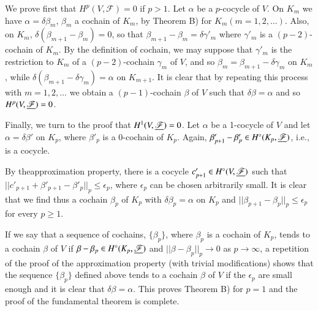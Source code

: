 \medskip
{} We prove first that $H^p(V,
\mathscr{F})=0$ if $p>1$.  Let $\alpha$ be a $p$-cocycle of $V$. On
$K_m$ we have $\alpha = \delta \beta_m$, $\beta_m$ a cochain of $K_m$,
by Theorem B) for $K_m (m = 1,2, \ldots)$. Also, on $K_m$, $\delta
(\beta_{m+1} - \beta_m) = 0$, so that $\beta_{m+1} - \beta_m = \delta
\gamma'_m$ where $\gamma'_m$ is a $(p-2)$-cochain of $K_m$. By the
definition of cochain, we may suppose that $\gamma'_m$ is the
restriction to $K_m$ of a $(p-2)$-cochain $\gamma_m$ of $V$, and so
$\beta_m = \beta_{m+1} - \delta \gamma_m$ on $K_{m}$, while $\delta
(\beta_{m+1} - \delta \gamma_m) = \alpha$ on $K_{m+1}$. It is clear
that by repeating this process with $m = 1,2, \ldots$ we obtain a
$(p-1)$-cochain $\beta$ of $V$ such that $\delta \beta = \alpha$ and
so $H^p (V, \underline{\mathscr{F}}) =0$. 

Finally, we turn to the proof that $H^1(V, \underline{\mathscr{F}}) = 0$. Let
$\alpha$ be a 1-cocycle of $V$ and let $\alpha = \delta \beta'$ on
$K_p$, where $\beta'_p$ is a 0-cochain of $K_p$. Again, $\beta'_{p+1}
- \beta'_{p} \in H^\circ (K_p , \underline{\mathscr{F}})$, i.e., is a
cocycle. 

By the\pageoriginale approximation property, there is a cocycle
$c'_{p+1} \in H^\circ (V, \underline{\mathscr{F}})$ such that $||c'_{p+1} +
\beta'_{p+1} - \beta'_{p}||_p \leq \epsilon_p$, where $\epsilon_p$ can be chosen
arbitrarily small. It is clear that we find thus a cochain $\beta_p$
of $K_p$ with $\delta \beta_p = \alpha$ on $K_p$ and $||\beta_{p+1} -
\beta_p||_{p} \leq \epsilon_p$ for every  $p \geq 1$. 

If we say that a sequence of cochains, $\{\beta_p\}$, where $\beta_p$
is a cochain of $K_p$, tends to a cochain $\beta$ of $V$ if $\beta -
\beta_p \in H^\circ (K_p, \underline{\mathscr{F}})$ and $||\beta - \beta_p||_p
\to 0$ as $ p \to \infty$, a repetition of the proof of the
approximation property (with trivial modifications) shows that the
sequence $\{\beta_p\}$ defined above tends to a cochain $\beta$ of $V$
if the $\epsilon_p$ are small enough and it is clear that $\delta \beta =
\alpha$. This proves Theorem B) for $p=1$ and the proof of the
fundamental theorem is complete. 



